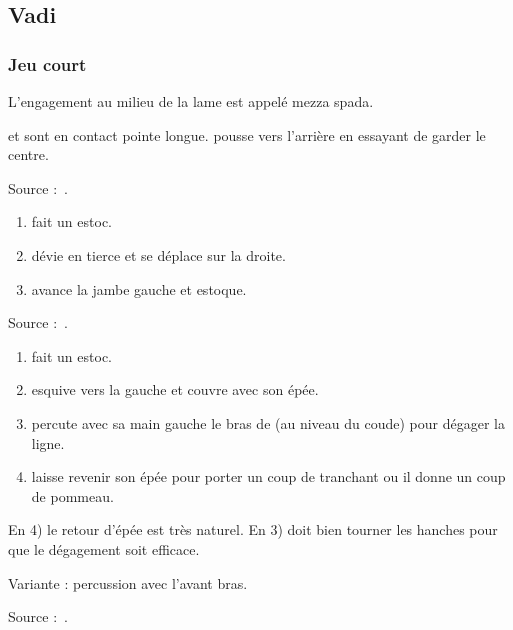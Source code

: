 \subsection{Vadi}


\subsubsection{Jeu court}




\begin{definition}

L'engagement au milieu de la lame est appelé mezza spada.

\end{definition}



\begin{exercice}
\A et \D sont en contact pointe longue.
\A pousse \D vers l'arrière en essayant de garder le centre.

Source :~\cite{petit:dijon:close_longword:2015}.
\end{exercice}


\begin{technique}

\begin{enumerate}
	\item \A fait un estoc.
	\item \D dévie en tierce et se déplace sur la droite.
	\item \D avance la jambe gauche et estoque.
\end{enumerate}

Source :~\cite{petit:dijon:close_longword:2015}.

\end{technique}


\begin{technique}

\begin{enumerate}
	\item \A fait un estoc.
	\item \D esquive vers la gauche et couvre avec son épée.
	\item \D percute avec sa main gauche le bras de \A (au niveau du coude) pour dégager la ligne.
	\item \D laisse revenir son épée pour porter un coup de tranchant ou il donne un coup de pommeau.
\end{enumerate}

En 4) le retour d'épée est très naturel.
En 3) \A doit bien tourner les hanches pour que le dégagement soit efficace.

Variante : percussion avec l'avant bras.

Source :~\cite{petit:dijon:close_longword:2015}.

\end{technique}


